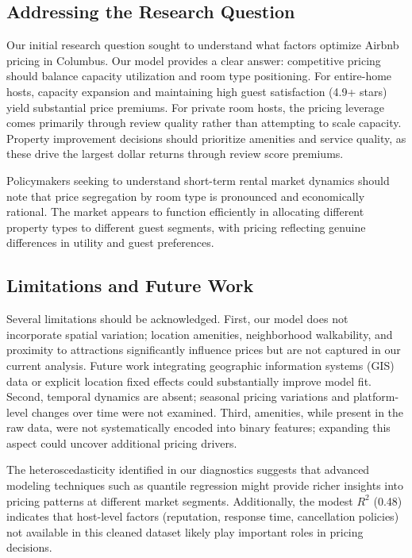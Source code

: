 \documentclass[9pt,a4paper,onecolumn,twoside]{tau-class/tau}
\begin{document}
\subsection{Addressing the Research Question}

Our initial research question sought to understand what factors optimize Airbnb pricing in Columbus. Our model provides a clear answer: competitive pricing should balance capacity utilization and room type positioning. For entire-home hosts, capacity expansion and maintaining high guest satisfaction (4.9+ stars) yield substantial price premiums. For private room hosts, the pricing leverage comes primarily through review quality rather than attempting to scale capacity. Property improvement decisions should prioritize amenities and service quality, as these drive the largest dollar returns through review score premiums.

Policymakers seeking to understand short-term rental market dynamics should note that price segregation by room type is pronounced and economically rational. The market appears to function efficiently in allocating different property types to different guest segments, with pricing reflecting genuine differences in utility and guest preferences.

\subsection{Limitations and Future Work}

Several limitations should be acknowledged. First, our model does not incorporate spatial variation; location amenities, neighborhood walkability, and proximity to attractions significantly influence prices but are not captured in our current analysis. Future work integrating geographic information systems (GIS) data or explicit location fixed effects could substantially improve model fit. Second, temporal dynamics are absent; seasonal pricing variations and platform-level changes over time were not examined. Third, amenities, while present in the raw data, were not systematically encoded into binary features; expanding this aspect could uncover additional pricing drivers.

The heteroscedasticity identified in our diagnostics suggests that advanced modeling techniques such as quantile regression might provide richer insights into pricing patterns at different market segments. Additionally, the modest $R^2$ (0.48) indicates that host-level factors (reputation, response time, cancellation policies) not available in this cleaned dataset likely play important roles in pricing decisions.
\end{document}
